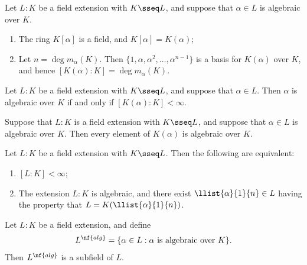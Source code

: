 \documentclass{article}
\begin{document}
  \begin{ttheorem}
    Let \( L:K \) be a field extension with \( K\sseq L \), and suppose that \( \alpha\in L \) is algebraic over \( K \).
    \begin{enumerate}[label=(\roman*)]
      \item The ring \( K[\alpha] \) is a field, and \( K[\alpha]=K(\alpha) \);
      \item Let \( n=\deg m_\alpha(K) \). Then \( \{1,\alpha,\alpha^2,\ldots,\alpha^{n-1}\} \) is a basis for \( K(\alpha) \) over \( K \), and hence \( [K(\alpha):K]=\deg m_\alpha(K) \).
    \end{enumerate}
  \end{ttheorem}

  \begin{tproposition}
    Let \( L:K \) be a field extension with \( K\sseq L \), and suppose that \( \alpha\in L \).
    Then \( \alpha \) is algebraic over \( K \) if and only if \( [K(\alpha):K]<\infty \).
  \end{tproposition}

  \begin{tproposition}
    Suppose that \( L:K \) is a field extension with \( K\sseq L \), and suppose that \( \alpha\in L \) is algebraic over \( K \).
    Then every element of \( K(\alpha) \) is algebraic over \( K \).
  \end{tproposition}

  \begin{ttheorem}
    Let \( L:K \) be a field extension with \( K\sseq L \). Then the following are equivalent:
    \begin{enumerate}[label=(\roman*)]
      \item \( [L:K]<\infty \);
      \item The extension \( L:K \) is algebraic, and there exist \( \llist{\alpha}{1}{n}\in L \) having the property that \( L=K(\llist{\alpha}{1}{n}) \).
    \end{enumerate}
  \end{ttheorem}

  \begin{tproposition}
    Let \( L:K \) be a field extension, and define
    \begin{align*}
      L^{\nf{alg}}=\{\alpha\in L : \alpha \text{ is algebraic over } K\}.
    \end{align*}
    Then \( L^{\nf{alg}} \) is a subfield of \( L \).
  \end{tproposition}
\end{document}
